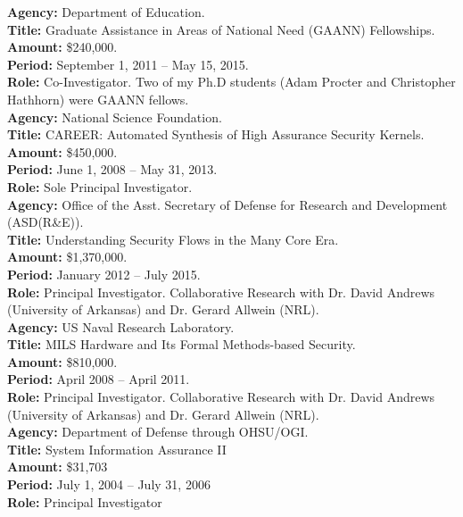 \documentclass[12pt]{article} %
\begin{document}


{\bf Agency:} Department of Education.
 ~\\
{\bf Title:} Graduate Assistance in Areas of National Need (GAANN) Fellowships.
\\
{\bf Amount:} \$240,000.
\\
{\bf Period:} September 1, 2011 -- May 15, 2015.
\\
{\bf Role:} Co-Investigator. Two of my Ph.D students (Adam Procter and Christopher Hathhorn) were GAANN fellows. 
\\

{\bf Agency:} National Science Foundation.
\\
{\bf Title:} CAREER: Automated Synthesis of High Assurance Security Kernels.
\\
{\bf Amount:} \$450,000.
\\
{\bf Period:}   June 1, 2008  --  May 31, 2013.
\\
{\bf Role:}      Sole Principal Investigator.
\\

{\bf Agency:} Office of the Asst. Secretary of Defense for Research and Development (ASD(R\&E)).
\\
{\bf Title:} Understanding Security Flows in the Many Core Era.
\\
{\bf Amount:} \$1,370,000.
\\
{\bf Period:}   January 2012  --  July 2015.
\\
{\bf Role:}      Principal Investigator. Collaborative Research with Dr. David Andrews (University of Arkansas) and Dr. Gerard Allwein (NRL).
\\

{\bf Agency:} US Naval Research Laboratory.
\\
{\bf Title:} MILS Hardware and Its Formal Methods-based Security.
\\
{\bf Amount:} \$810,000.
\\
{\bf Period:}   April 2008  --  April 2011.
\\
{\bf Role:}      Principal Investigator. Collaborative Research with Dr. David Andrews (University of Arkansas) and Dr. Gerard Allwein (NRL).
\\


{\bf Agency:} Department of Defense through OHSU/OGI.
\\
{\bf Title:} System Information Assurance II
\\
{\bf Amount:} \$31,703 
\\
{\bf Period:}   July 1, 2004  --  July 31, 2006
\\
{\bf Role:}      Principal Investigator
\end{document}
